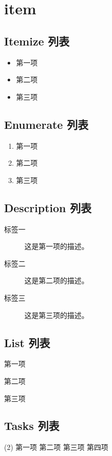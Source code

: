 
\chapter{item}

\section*{Itemize 列表}
\begin{itemize}
    \item 第一项
    \item 第二项
    \item 第三项
\end{itemize}

\section*{Enumerate 列表}
\begin{enumerate}
    \item 第一项
    \item 第二项
    \item 第三项
\end{enumerate}

\section*{Description 列表}
\begin{description}
    \item[标签一] 这是第一项的描述。
    \item[标签二] 这是第二项的描述。
    \item[标签三] 这是第三项的描述。
\end{description}

\section*{List 列表}
\begin{list}{--}{
    \setlength{\leftmargin}{2em}
    \setlength{\itemsep}{0.5em}
}
    \item 第一项
    \item 第二项
    \item 第三项
\end{list}

\section*{Tasks 列表}
\begin{tasks}(2) %
    \task 第一项
    \task 第二项
    \task 第三项
    \task 第四项
\end{tasks}

